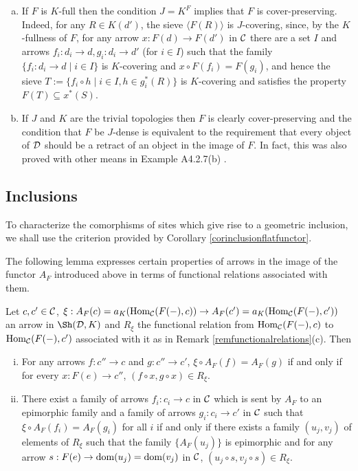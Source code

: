\documentclass[a4paper,12pt]{article}
\begin{document}
\begin{remarks}\label{remsurjectioncomorphismofsites}
	\begin{enumerate}[(a)]
		\item If $F$ is $K$-full then the condition $J=K^{F}$ implies that $F$ is cover-preserving. Indeed, for any $R\in K(d')$, the sieve $\langle F(R)\rangle  $ is $J$-covering, since, by the $K$-fullness of $F$, for any arrow $x:F(d)\to F(d')$ in $\cal C$ there are a set $I$ and arrows $f_{i}:d_{i}\to d, g_{i}:d_{i}\to d'$ (for $i\in I$) such that the family $\{f_{i}:d_{i}\to d \mid i\in I\}$ is $K$-covering and $x\circ F(f_{i})=F(g_{i})$, and hence the sieve $T:=\{f_{i}\circ h \mid i\in I, h\in  g_{i}^{\ast}(R) \}$ is $K$-covering and satisfies the property $F(T)\subseteq x^{\ast}(S)$. 
		
		\item If $J$ and $K$ are the trivial topologies then $F$ is clearly cover-preserving and the condition that $F$ be $J$-dense is equivalent to the requirement that every object of $\cal D$ should be a retract of an object in the image of $F$. In fact, this was also proved with other means in Example A4.2.7(b) \cite{El}.	 
	\end{enumerate}
\end{remarks}

\subsection{Inclusions}

To characterize the comorphisms of sites which give rise to a geometric inclusion, we shall use the criterion provided by Corollary \ref{corinclusionflatfunctor}. 

The following lemma expresses certain properties of arrows in the image of the functor $A_{F}$ introduced above in terms of functional relations associated with them.
 
\begin{lemma}\label{lemprop}
	Let $c, c'\in {\cal C}$, $\xi:A_{F}(c)=a_{K}(\textup{Hom}_{\cal C}(F(-),c))\to A_{F}(c')=a_{K}(\textup{Hom}_{\cal C}(F(-),c'))$ an arrow in $\Sh({\cal D}, K)$ and $R_{\xi}$ the functional relation from $\textup{Hom}_{\cal C}(F(-),c)$ to $\textup{Hom}_{\cal C}(F(-),c')$ associated with it as in Remark \ref{remfunctionalrelations}(c). Then 
	\begin{enumerate}[(i)]
		\item For any arrows $f:c''\to c$ and $g:c''\to c'$, $\xi\circ A_{F}(f)=A_{F}(g)$ if and only if for every $x:F(e)\to c''$, $(f\circ x, g\circ x)\in R_{\xi}$. 
		
		\item There exist a family of arrows $f_{i}:c_{i}\to c$ in $\cal C$ which is sent by $A_{F}$ to an epimorphic family and a family of arrows $g_{i}:c_{i}\to c'$ in $\cal C$ such that $\xi\circ A_{F}(f_{i})=A_{F}(g_{i})$ for all $i$ if and only if there exists a family $(u_{j}, v_{j})$ of elements of $R_{\xi}$ such that the family $\{A_{F}(u_{j})\}$ is epimorphic and for any arrow $s:F(e)\to \textup{dom}(u_{j})=\textup{dom}(v_{j})$ in $\cal C$, $(u_{j}\circ s, v_{j}\circ s)\in R_{\xi}$.
	\end{enumerate}
\end{lemma}
\end{document}
